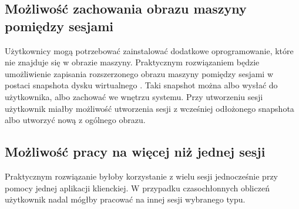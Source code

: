 \documentclass[../podsumowanie.tex]{subfiles}
\begin{document}
\subsection{Możliwość zachowania obrazu maszyny pomiędzy sesjami}
Użytkownicy mogą potrzebować zainstalować dodatkowe oprogramowanie, które nie znajduje się w obrazie maszyny.
Praktycznym rozwiązaniem będzie umożliwienie zapisania rozszerzonego obrazu maszyny pomiędzy sesjami w postaci snapshota dysku wirtualnego \parencite{libvirt-snapshot}.
Taki snapshot można albo wysłać do użytkownika, albo zachować we wnętrzu systemu.
Przy utworzeniu sesji użytkownik miałby możliwość utworzenia sesji z wcześniej odłożonego snapshota albo utworzyć nową z ogólnego obrazu.

\subsection{Możliwość pracy na więcej niż jednej sesji}
Praktycznym rozwiązanie byłoby korzystanie z wielu sesji jednocześnie przy pomocy jednej aplikacji klienckiej.
W przypadku czasochłonnych obliczeń użytkownik nadal mógłby pracować na innej sesji wybranego typu.
\end{document}

